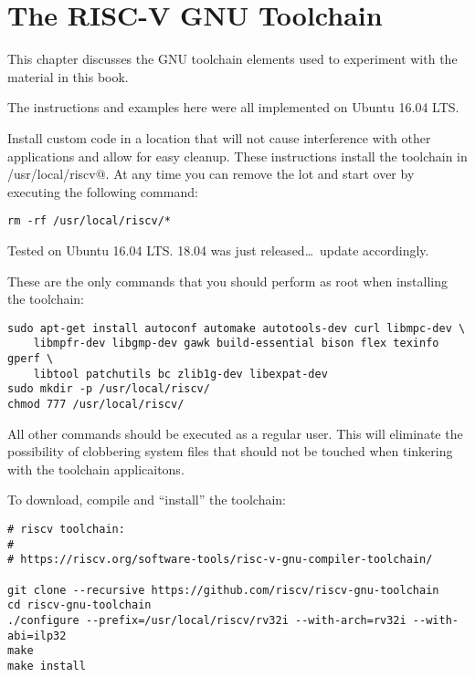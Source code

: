 \chapter{The RISC-V GNU Toolchain}

This chapter discusses the GNU toolchain elements used to
experiment with the material in this book.

The
instructions and examples here were all implemented on Ubuntu 16.04 LTS. 

Install custom code in a location that will not cause interference with
other applications and allow for easy cleanup.  These instructions 
install the toolchain in \verb@/usr/local/riscv@.  At any time
you can remove the lot and start over by executing the following 
command:

\begin{verbatim}
rm -rf /usr/local/riscv/*
\end{verbatim}


Tested on Ubuntu 16.04 LTS.   
18.04 was just released\ldots\ update accordingly.

These are the only commands that you should perform as root when installing
the toolchain:

\begin{verbatim}
sudo apt-get install autoconf automake autotools-dev curl libmpc-dev \
	libmpfr-dev libgmp-dev gawk build-essential bison flex texinfo gperf \
	libtool patchutils bc zlib1g-dev libexpat-dev
sudo mkdir -p /usr/local/riscv/
chmod 777 /usr/local/riscv/ 
\end{verbatim}

All other commands should be executed as a regular user.  This will eliminate the
possibility of clobbering system files that should not be touched when tinkering with
the toolchain applicaitons.

To download, compile and ``install'' the toolchain:

\begin{verbatim}
# riscv toolchain:
# 
# https://riscv.org/software-tools/risc-v-gnu-compiler-toolchain/

git clone --recursive https://github.com/riscv/riscv-gnu-toolchain
cd riscv-gnu-toolchain
./configure --prefix=/usr/local/riscv/rv32i --with-arch=rv32i --with-abi=ilp32
make
make install
\end{verbatim}

